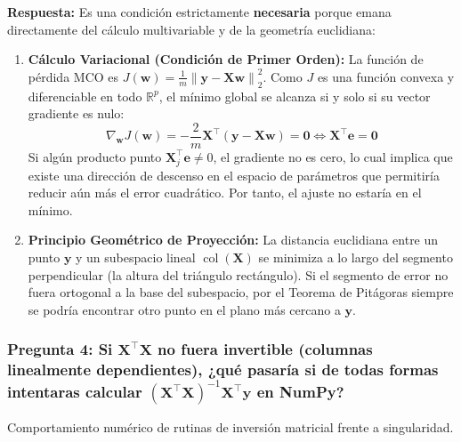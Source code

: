\documentclass[12pt,a4paper]{article}
\newcommand{\R}{\mathbb{R}}
\newcommand{\norm}[1]{\left\lVert #1\right\rVert}
\newcommand{\col}{\operatorname{col}}
\begin{document}
\textbf{Respuesta:}
Es una condición estrictamente \textbf{necesaria} porque emana directamente del cálculo multivariable y de la geometría euclidiana:
\begin{enumerate}
  \item \textbf{Cálculo Variacional (Condición de Primer Orden):} La función de pérdida MCO es $J(\mathbf{w}) = \frac{1}{m} \norm{\mathbf{y} - \mathbf{X}\mathbf{w}}_2^2$. Como $J$ es una función convexa y diferenciable en todo $\R^p$, el mínimo global se alcanza si y solo si su vector gradiente es nulo:
  \begin{equation}
    \nabla_{\mathbf{w}} J(\mathbf{w}) = -\frac{2}{m} \mathbf{X}^\top (\mathbf{y} - \mathbf{X}\mathbf{w}) = \mathbf{0} \iff \mathbf{X}^\top \mathbf{e} = \mathbf{0}
  \end{equation}
  Si algún producto punto $\mathbf{X}_j^\top \mathbf{e} \ne 0$, el gradiente no es cero, lo cual implica que existe una dirección de descenso en el espacio de parámetros que permitiría reducir aún más el error cuadrático. Por tanto, el ajuste no estaría en el mínimo.
  \item \textbf{Principio Geométrico de Proyección:} La distancia euclidiana entre un punto $\mathbf{y}$ y un subespacio lineal $\col(\mathbf{X})$ se minimiza a lo largo del segmento perpendicular (la altura del triángulo rectángulo). Si el segmento de error no fuera ortogonal a la base del subespacio, por el Teorema de Pitágoras siempre se podría encontrar otro punto en el plano más cercano a $\mathbf{y}$.
\end{enumerate}

\vspace{10pt}
\subsubsection*{Pregunta 4: Si $\mathbf{X}^\top \mathbf{X}$ no fuera invertible (columnas linealmente dependientes), ¿qué pasaría si de todas formas intentaras calcular $(\mathbf{X}^\top \mathbf{X})^{-1} \mathbf{X}^\top \mathbf{y}$ en NumPy?}
\begin{pthreeProblem}
Comportamiento numérico de rutinas de inversión matricial frente a singularidad.
\end{pthreeProblem}
\end{document}
